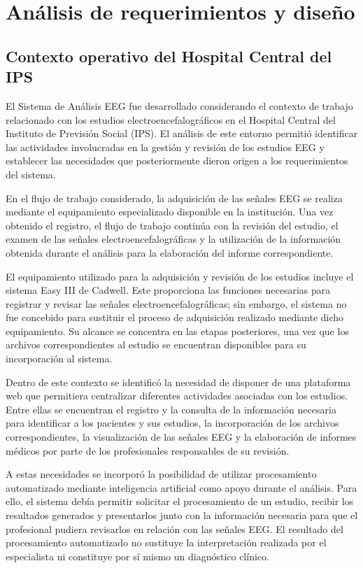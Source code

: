 \chapter{Análisis de requerimientos y diseño}
\label{cap:analisis-diseno}

\section{Contexto operativo del Hospital Central del IPS}
\label{sec:contexto-operativo-ips}

El Sistema de Análisis EEG fue desarrollado considerando el contexto de trabajo relacionado con
los estudios electroencefalográficos en el Hospital Central del Instituto de
Previsión Social (IPS). El análisis de este entorno permitió identificar las
actividades involucradas en la gestión y revisión de los estudios EEG y
establecer las necesidades que posteriormente dieron origen a los
requerimientos del sistema.

En el flujo de trabajo considerado, la adquisición de las señales EEG se
realiza mediante el equipamiento especializado disponible en la institución.
Una vez obtenido el registro, el flujo de trabajo continúa con la revisión
del estudio, el examen de las señales electroencefalográficas y la utilización
de la información obtenida durante el análisis para la elaboración del informe
correspondiente.

El equipamiento utilizado para la adquisición y revisión de los estudios
incluye el sistema Easy III de Cadwell. Este proporciona las funciones
necesarias para registrar y revisar las señales electroencefalográficas; sin embargo, el sistema no fue concebido para sustituir el proceso de
adquisición realizado mediante dicho equipamiento. Su alcance se concentra en
las etapas posteriores, una vez que los archivos correspondientes al estudio
se encuentran disponibles para su incorporación al sistema.

Dentro de este contexto se identificó la necesidad de disponer de una
plataforma web que permitiera centralizar diferentes actividades asociadas con
los estudios. Entre ellas se encuentran el registro y la consulta de la información necesaria para identificar a los pacientes y sus estudios, la incorporación de los archivos correspondientes, la visualización de las señales EEG y la elaboración de informes médicos por parte de los profesionales responsables de su revisión.

A estas necesidades se incorporó la posibilidad de utilizar procesamiento
automatizado mediante inteligencia artificial como apoyo durante el análisis.
Para ello, el sistema debía permitir solicitar el procesamiento de un estudio,
recibir los resultados generados y presentarlos junto con la información
necesaria para que el profesional pudiera revisarlos en relación con las
señales EEG. El resultado del procesamiento automatizado no sustituye la
interpretación realizada por el especialista ni constituye por sí mismo un
diagnóstico clínico.

